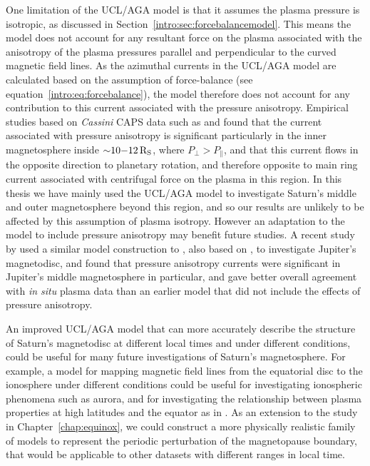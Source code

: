 One limitation of the UCL/AGA model is that it assumes the plasma pressure is isotropic, as discussed in Section~\ref{intro:sec:forcebalancemodel}.  This means the model does not account for any resultant force on the plasma associated with the anisotropy of the plasma pressures parallel and perpendicular to the curved magnetic field lines. As the azimuthal currents in the UCL/AGA model are calculated based on the assumption of force-balance (see equation~\ref{intro:eq:forcebalance}), the model therefore does not account for any contribution to this current associated with the pressure anisotropy. Empirical studies based on \textit{Cassini} CAPS data such as \citet{sergis2010} and \citet{kellett2011} found that the current associated with pressure anisotropy is significant particularly in the inner magnetosphere inside ${\sim}10{\--}\SI{12}{R_S}$, where $P_\perp > P_\parallel$, and that this current flows in the opposite direction  to planetary rotation, and therefore opposite to main ring current associated with centrifugal force on the plasma in this region. In this thesis we have mainly  used the UCL/AGA model to investigate Saturn's middle and outer magnetosphere beyond this region, and so our results are unlikely to be affected by this assumption of plasma isotropy. However an adaptation to the model to include pressure anisotropy may benefit future studies. A recent study by \citet{nichols2015} used a similar model construction to \citet{achilleos2010a}, also based on \citet{caudal1986}, to investigate Jupiter's magnetodisc, and found that pressure anisotropy currents were significant in Jupiter's middle magnetosphere in particular, and gave better overall agreement with \textit{in situ} plasma data than an earlier model \citep{nichols2011} that did not include the effects of pressure anisotropy.

An improved UCL/AGA model that can more accurately describe the structure of Saturn's magnetodisc at different local times and under different conditions, could be useful for many future investigations of Saturn's magnetosphere. For example, a model for  mapping magnetic field lines from the equatorial disc to the ionosphere under  different conditions could be useful for investigating ionospheric phenomena such as aurora, and for investigating the relationship between plasma properties at high latitudes and the equator as in \citet{sergis2018}. As an extension to the study  in Chapter~\ref{chap:equinox}, we could construct a  more physically realistic family of models to represent the periodic perturbation of the magnetopause boundary, that would be applicable to other datasets with different ranges in local time.

